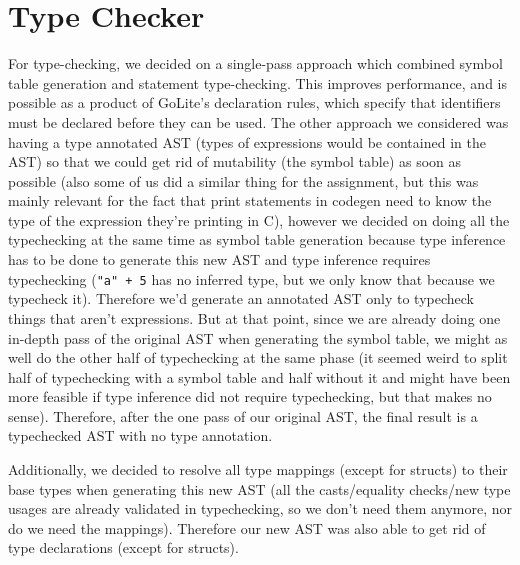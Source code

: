 \documentclass[11pt]{article}
\begin{document}
\section{Type Checker}
\label{sec:org140d8de}
For type-checking, we decided on a single-pass approach which
combined symbol table generation and statement type-checking. This
improves performance, and is possible as a product of GoLite's
declaration rules, which specify that identifiers must be declared
before they can be used. The other approach we considered was having
a type annotated AST (types of expressions would be contained in the
AST) so that we could get rid of mutability (the symbol table) as
soon as possible (also some of us did a similar thing for the
assignment, but this was mainly relevant for the fact that print
statements in codegen need to know the type of the expression
they're printing in C), however we decided on doing all the
typechecking at the same time as symbol table generation because
type inference has to be done to generate this new AST and type
inference requires typechecking (\texttt{"a" + 5} has no inferred type, but
we only know that because we typecheck it). Therefore we'd generate
an annotated AST only to typecheck things that aren't
expressions. But at that point, since we are already doing one
in-depth pass of the original AST when generating the symbol table,
we might as well do the other half of typechecking at the same phase
(it seemed weird to split half of typechecking with a symbol table
and half without it and might have been more feasible if type
inference did not require typechecking, but that makes no
sense). Therefore, after the one pass of our original AST, the final
result is a typechecked AST with no type annotation.

Additionally, we decided to resolve all type mappings (except for
structs) to their base types when generating this new AST (all the
casts/equality checks/new type usages are already validated in
typechecking, so we don't need them anymore, nor do we need the
mappings). Therefore our new AST was also able to get rid of type
declarations (except for structs).
\end{document}

